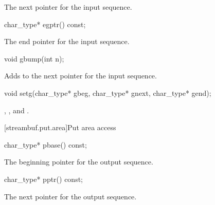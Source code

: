 \begin{itemdescr}
\pnum
\returns
The next pointer for the input sequence.
\end{itemdescr}

%
\begin{itemdecl}
char_type* egptr() const;
\end{itemdecl}

\begin{itemdescr}
\pnum
\returns
The end pointer for the input sequence.
\end{itemdescr}

%
\begin{itemdecl}
void gbump(int n);
\end{itemdecl}

\begin{itemdescr}
\pnum
\effects
Adds  to the next pointer for the input sequence.
\end{itemdescr}

%
\begin{itemdecl}
void setg(char_type* gbeg, char_type* gnext, char_type* gend);
\end{itemdecl}

\begin{itemdescr}
\pnum
\postconditions
{},
,
and
.
\end{itemdescr}

[streambuf.put.area]{Put area access}

%
\begin{itemdecl}
char_type* pbase() const;
\end{itemdecl}

\begin{itemdescr}
\pnum
\returns
The beginning pointer for the output sequence.
\end{itemdescr}

%
\begin{itemdecl}
char_type* pptr() const;
\end{itemdecl}

\begin{itemdescr}
\pnum
\returns
The next pointer for the output sequence.
\end{itemdescr}

